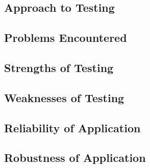 \subsection{Approach to Testing}

\subsection{Problems Encountered}

\subsection{Strengths of Testing}

\subsection{Weaknesses of Testing}

\subsection{Reliability of Application}

\subsection{Robustness of Application}